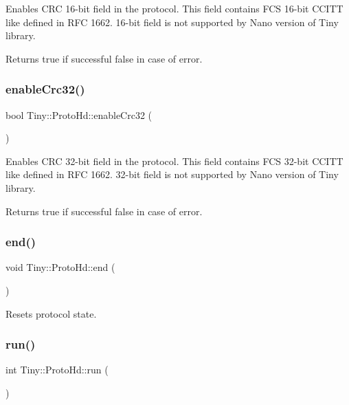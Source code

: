 Enables C\+RC 16-\/bit field in the protocol. This field contains F\+CS 16-\/bit C\+C\+I\+TT like defined in R\+FC 1662. 16-\/bit field is not supported by Nano version of Tiny library. \begin{DoxyReturn}{Returns}
true if successful false in case of error. 
\end{DoxyReturn}
\mbox{\label{classTiny_1_1ProtoHd_a4110a0112548d5e47d312d190930ad20}} 
\subsubsection{\texorpdfstring{enable\+Crc32()}{enableCrc32()}}
{\footnotesize\ttfamily bool Tiny\+::\+Proto\+Hd\+::enable\+Crc32 (\begin{DoxyParamCaption}{ }\end{DoxyParamCaption})}

Enables C\+RC 32-\/bit field in the protocol. This field contains F\+CS 32-\/bit C\+C\+I\+TT like defined in R\+FC 1662. 32-\/bit field is not supported by Nano version of Tiny library. \begin{DoxyReturn}{Returns}
true if successful false in case of error. 
\end{DoxyReturn}
\mbox{\label{classTiny_1_1ProtoHd_ac87bf8264895b654025001a0e6014f3f}} 
\subsubsection{\texorpdfstring{end()}{end()}}
{\footnotesize\ttfamily void Tiny\+::\+Proto\+Hd\+::end (\begin{DoxyParamCaption}{ }\end{DoxyParamCaption})}

Resets protocol state. \mbox{\label{classTiny_1_1ProtoHd_af07b1f5d0df3021e00a4b4f04af4150b}} 
\subsubsection{\texorpdfstring{run()}{run()}}
{\footnotesize\ttfamily int Tiny\+::\+Proto\+Hd\+::run (\begin{DoxyParamCaption}{ }\end{DoxyParamCaption})}


